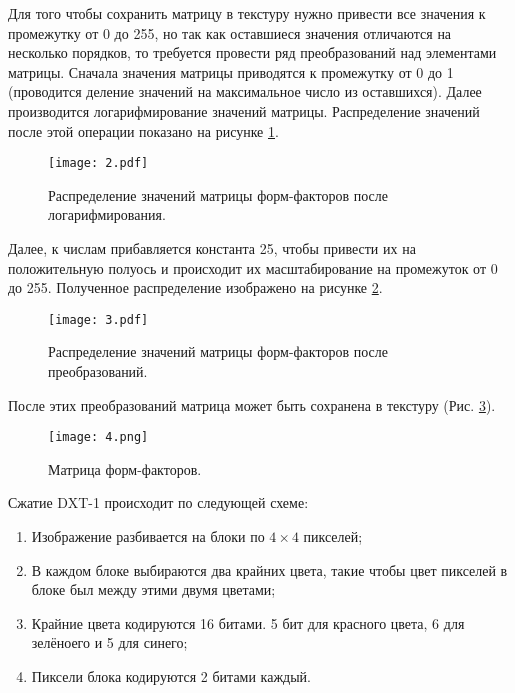 \documentclass[12pt,fleqn]{article}
\begin{document}
Для того чтобы сохранить матрицу в текстуру нужно привести все значения к промежутку от 0 до 255, но так как оставшиеся значения отличаются на несколько порядков, то требуется провести ряд преобразований над элементами матрицы. Сначала значения матрицы приводятся к промежутку от 0 до 1 (проводится деление значений на максимальное число из оставшихся). Далее производится логарифмирование значений матрицы. Распределение значений после этой операции показано на рисунке \ref{log_distribution}.

\begin{figure}[htb]
    \centering
    \texttt{[image: 2.pdf]}
    \caption{Распределение значений матрицы форм-факторов после логарифмирования.}
    \label{log_distribution}
\end{figure}

Далее, к числам прибавляется константа 25, чтобы привести их на положительную полуось и происходит их масштабирование на промежуток от 0 до 255. Полученное распределение изображено на рисунке \ref{result_distribution}.

\begin{figure}[htb]
    \centering
    \texttt{[image: 3.pdf]}
    \caption{Распределение значений матрицы форм-факторов после преобразований.}
    \label{result_distribution}
\end{figure}

После этих преобразований матрица может быть сохранена в текстуру (Рис. \ref{ff_matrix}).

\pagebreak

\begin{figure}[htb]
    \centering
    \texttt{[image: 4.png]}
    \caption{Матрица форм-факторов.}
    \label{ff_matrix}
\end{figure}

Сжатие DXT-1 происходит по следующей схеме:

\begin{enumerate}

\item Изображение разбивается на блоки по $4\times4$ пикселей;

\item В каждом блоке выбираются два крайних цвета, такие чтобы цвет пикселей в блоке был между этими двумя цветами;

\item Крайние цвета кодируются 16 битами. 5 бит для красного цвета, 6 для зелёноего и 5 для синего;

\item Пиксели блока кодируются 2 битами каждый.

\end{enumerate}
\end{document}
